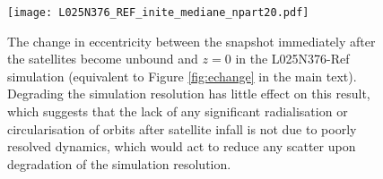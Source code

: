 \begin{figure}
\texttt{[image: L025N376\_REF\_inite\_mediane\_npart20.pdf]}
\caption[A recreation of Figure \ref{fig:echange} using satellites accreted onto Milky Way mass haloes in the lower resolution Ref-L025N376 simulation]{\label{fig:echange_lowres} The change in eccentricity between the snapshot immediately after the satellites become unbound and $z=0$ in the L025N376-Ref simulation (equivalent to Figure \ref{fig:echange} in the main text). Degrading the simulation resolution has little effect on this result, which suggests that the lack of any significant radialisation or circularisation of orbits after satellite infall is not due to poorly resolved dynamics, which would act to reduce any scatter upon degradation of the simulation resolution.  }
\end{figure}


